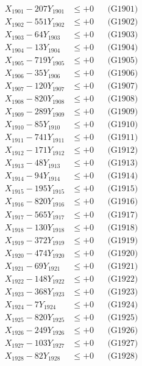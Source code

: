 \documentclass[a4paper,10pt]{article}
\begin{document}
{\begin{align}
\allowbreak
X_{1901} - 207Y_{1901} &\leq +0 && \text{(G1901)} \\
X_{1902} - 551Y_{1902} &\leq +0 && \text{(G1902)} \\
X_{1903} - 64Y_{1903} &\leq +0 && \text{(G1903)} \\
X_{1904} - 13Y_{1904} &\leq +0 && \text{(G1904)} \\
X_{1905} - 719Y_{1905} &\leq +0 && \text{(G1905)} \\
X_{1906} - 35Y_{1906} &\leq +0 && \text{(G1906)} \\
X_{1907} - 120Y_{1907} &\leq +0 && \text{(G1907)} \\
X_{1908} - 820Y_{1908} &\leq +0 && \text{(G1908)} \\
X_{1909} - 289Y_{1909} &\leq +0 && \text{(G1909)} \\
X_{1910} - 85Y_{1910} &\leq +0 && \text{(G1910)} \\
\allowbreak
X_{1911} - 741Y_{1911} &\leq +0 && \text{(G1911)} \\
X_{1912} - 171Y_{1912} &\leq +0 && \text{(G1912)} \\
X_{1913} - 48Y_{1913} &\leq +0 && \text{(G1913)} \\
X_{1914} - 94Y_{1914} &\leq +0 && \text{(G1914)} \\
X_{1915} - 195Y_{1915} &\leq +0 && \text{(G1915)} \\
X_{1916} - 820Y_{1916} &\leq +0 && \text{(G1916)} \\
X_{1917} - 565Y_{1917} &\leq +0 && \text{(G1917)} \\
X_{1918} - 130Y_{1918} &\leq +0 && \text{(G1918)} \\
X_{1919} - 372Y_{1919} &\leq +0 && \text{(G1919)} \\
X_{1920} - 474Y_{1920} &\leq +0 && \text{(G1920)} \\
\allowbreak
X_{1921} - 69Y_{1921} &\leq +0 && \text{(G1921)} \\
X_{1922} - 148Y_{1922} &\leq +0 && \text{(G1922)} \\
X_{1923} - 368Y_{1923} &\leq +0 && \text{(G1923)} \\
X_{1924} - 7Y_{1924} &\leq +0 && \text{(G1924)} \\
X_{1925} - 820Y_{1925} &\leq +0 && \text{(G1925)} \\
X_{1926} - 249Y_{1926} &\leq +0 && \text{(G1926)} \\
X_{1927} - 103Y_{1927} &\leq +0 && \text{(G1927)} \\
X_{1928} - 82Y_{1928} &\leq +0 && \text{(G1928)} \\

\end{align}}
\end{document}
